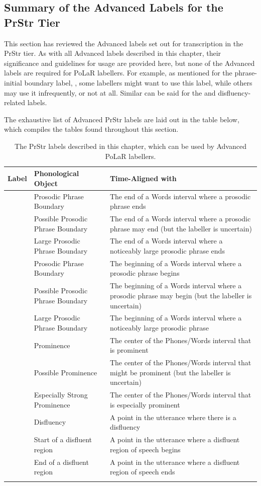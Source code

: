 \documentclass[11pt, twoside]{memoir}
\def\textlabel#1{{\relsize{-.5}\fontspec[Mapping=tex-text]{Roboto Mono}{#1}}}
\begin{document}
\subsection{Summary of the Advanced Labels for the PrStr Tier}
This section has reviewed the Advanced labels set out for transcription in the PrStr tier. As with all Advanced labels described in this chapter, their significance and guidelines for usage are provided here, but none of the Advanced labels are required for PoLaR labellers. For example, as mentioned for the phrase-initial boundary label, \textlabel{[}, some labellers might want to use this label, while others may use it infrequently, or not at all. Similar can be said for the \textlabel{**} and disfluency-related labels.

The exhaustive list of Advanced PrStr labels are laid out in the table below, which compiles the tables found throughout this section.

\begin{longtable}{cp{.3\linewidth}p{.45\linewidth}}
	\toprule
	\textbf{Label} & \textbf{Phonological Object} & \textbf{Time-Aligned with} \tabularnewline
	\midrule
	\endhead
	\rowcolor{green}
	\textlabel{]} & Prosodic Phrase Boundary & The end of a Words interval where a prosodic phrase ends \tabularnewline
	\textlabel{?]} & Possible Prosodic Phrase Boundary & The end of a Words interval where a prosodic phrase may end (but the labeller is uncertain) \tabularnewline
	\textlabel{]]} & Large Prosodic Phrase Boundary & The end of a Words interval where a noticeably large prosodic phrase ends \tabularnewline
	\textlabel{[} & Prosodic Phrase Boundary & The beginning of a Words interval where a prosodic phrase begins \tabularnewline
	\textlabel{?[} & Possible Prosodic Phrase Boundary & The beginning of a Words interval where a prosodic phrase may begin (but the labeller is uncertain) \tabularnewline
	\textlabel{[[} & Large Prosodic Phrase Boundary & The beginning of a Words interval where a noticeably large prosodic phrase \tabularnewline
	\hline
	\rowcolor{green}
	\textlabel{*} & Prominence & The center of the Phones/Words interval that is prominent\tabularnewline
	\textlabel{?*} & Possible Prominence & The center of the Phones/Words interval that might be prominent (but the labeller is uncertain) \tabularnewline
	\textlabel{**} & Especially Strong Prominence & The center of the Phones/Words interval that is especially prominent \tabularnewline
	\hline
	\textlabel{d} & Disfluency & A point in the utterance where there is a disfluency\tabularnewline
	\textlabel{\{d} & Start of a disfluent region & A point in the utterance where a disfluent region of speech begins\tabularnewline
	\textlabel{d\}} & End of a disfluent region & A point in the utterance where a disfluent region of speech ends\tabularnewline
	\bottomrule
	\caption{The PrStr labels described in this chapter, which can be used by Advanced PoLaR labellers.}
\end{longtable}
\end{document}
